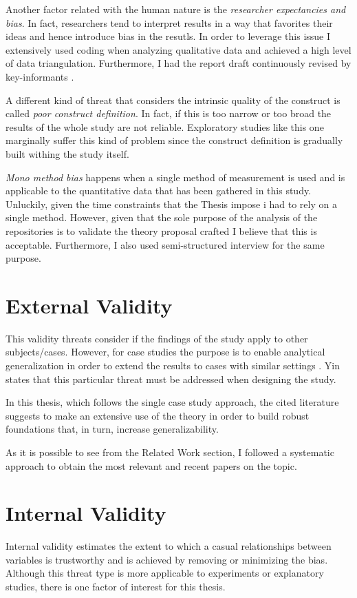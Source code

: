     Another factor related with the human nature is the \textit{researcher expectancies and bias}. In fact, researchers tend to interpret results in a way that favorites their ideas and hence introduce bias in the resutls. In order to leverage this issue I extensively used coding when analyzing qualitative data and achieved a high level of data triangulation. Furthermore, I had the report draft continuously revised by key-informants \cite{case_study_guide}.
    
    A different kind of threat that considers the intrinsic quality of the construct is called \textit{poor construct definition}. In fact, if this is too narrow or too broad the results of the whole study are not reliable. Exploratory studies like this one marginally suffer this kind of problem since the construct definition is gradually built withing the study itself.
    
    \textit{Mono method bias} happens when a single method of measurement is used and is applicable to the quantitative data that has been gathered in this study. Unluckily, given the time constraints that the Thesis impose i had to rely on a single method. However, given that the sole purpose of the analysis of the repositories is to validate the theory proposal crafted I believe that this is acceptable. Furthermore, I also used semi-structured interview for the same purpose.

\section{External Validity}
This validity threats consider if the findings of the study apply to other subjects/cases. However, for case studies the purpose is to enable analytical generalization in order to extend the results to cases with similar settings \cite{case_study_software_engineering}. Yin \cite{case_study_guide} states that this particular threat must be addressed when designing the study.

In this thesis, which follows the single case study approach, the cited literature suggests to make an extensive use of the theory in order to build robust foundations that, in turn, increase generalizability.

As it is possible to see from the Related Work section, I followed a systematic approach to obtain the most relevant and recent papers on the topic.

\section{Internal Validity}
Internal validity estimates the extent to which a casual relationships between variables is trustworthy and is achieved by removing or minimizing the bias. Although this threat type is more applicable to experiments or explanatory studies, there is one factor of interest for this thesis.


